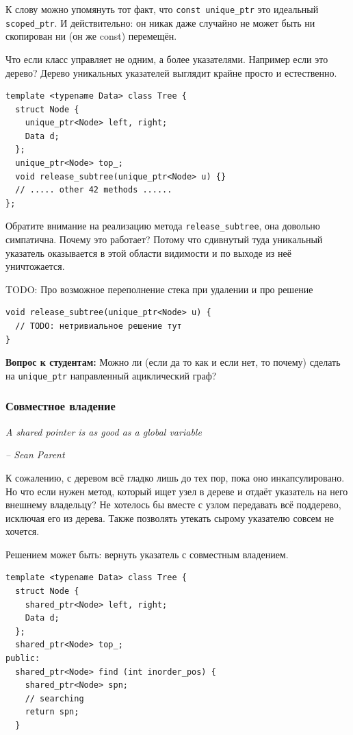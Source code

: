 \documentclass[a4paper,12pt,oneside]{article}
\begin{document}
К слову можно упомянуть тот факт, что \lstinline!const unique_ptr! это идеальный \lstinline!scoped_ptr!. И действительно: он никак даже случайно не может быть ни скопирован ни (он же const) перемещён.

Что если класс управляет не одним, а более указателями. Например если это дерево? Дерево уникальных указателей выглядит крайне просто и естественно.

\begin{lstlisting}
template <typename Data> class Tree {
  struct Node {
    unique_ptr<Node> left, right;
    Data d;
  };
  unique_ptr<Node> top_;
  void release_subtree(unique_ptr<Node> u) {}
  // ..... other 42 methods ......
};
\end{lstlisting}

Обратите внимание на реализацию метода \lstinline!release_subtree!, она довольно симпатична. Почему это работает? Потому что сдивнутый туда уникальный указатель оказывается в этой области видимости и по выходе из неё уничтожается.

TODO: Про возможное переполнение стека при удалении и про решение

\begin{lstlisting}
void release_subtree(unique_ptr<Node> u) {
  // TODO: нетривиальное решение тут
}  
\end{lstlisting}

\textbf{Вопрос к студентам:} Можно ли (если да то как и если нет, то почему) сделать на \lstinline!unique_ptr! направленный ациклический граф?

\subsubsection{Совместное владение}\label{subsub:sharedptrs}

\hfill\textit{A shared pointer is as good as a global variable} {\vspace{0.5em}}

\hfill\textit{-- Sean Parent}

К сожалению, с деревом всё гладко лишь до тех пор, пока оно инкапсулировано. Но что если нужен метод, который ищет узел в дереве и отдаёт указатель на него внешнему владельцу? Не хотелось бы вместе с узлом передавать всё поддерево, исключая его из дерева. Также позволять утекать сырому указателю совсем не хочется.

Решением может быть: вернуть указатель с совместным владением.

\begin{lstlisting}
template <typename Data> class Tree {
  struct Node {
    shared_ptr<Node> left, right;
    Data d;
  };
  shared_ptr<Node> top_;
public: 
  shared_ptr<Node> find (int inorder_pos) {
    shared_ptr<Node> spn;
    // searching
    return spn;
  }
\end{lstlisting}
\end{document}
